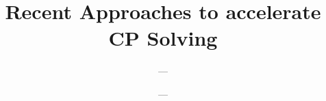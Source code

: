 \def\languages{main=german,english}


\title{Recent Approaches to accelerate CP Solving}

\author{---}
\matrno{---}






\date{---}

\advisor{---}

